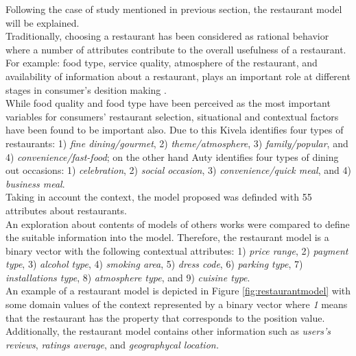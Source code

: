 Following the case of study mentioned in previous section,   the
restaurant model will be explained.\\  Traditionally, choosing a
restaurant has been considered as rational behavior where a number of
attributes contribute to the overall usefulness of a restaurant. For
example: food type, service quality, atmosphere of the restaurant, and
availability of information about a restaurant, plays an important
role at different stages in consumer's desition
making  \cite{auty1992consumer}. \\ 
While food quality and food type have
been perceived as the most important variables for consumers'
restaurant selection, situational and contextual factors have been
found to be important also. Due to this
Kivela  \cite{jack1997restaurant} identifies four types of restaurants:
1) \textit{fine dining/gourmet}, 2) \textit{theme/atmosphere}, 3)
\textit{family/popular}, and 4) \textit{convenience/fast-food}; on the
other hand Auty  \cite{auty1992consumer} identifies four types of dining
out occasions: 1) \textit{celebration}, 2) \textit{social occasion},
3) \textit{convenience/quick meal}, and 4) \textit{business meal}.\\
Taking in account the context, the model proposed was definded with 55
attributes about restaurants. \\ An exploration about contents of models
of others works were compared to define the suitable information into
the model. Therefore, the restaurant model is a binary vector with the
following contextual attributes: 1) \textit{price range}, 2)
\textit{payment type}, 3) \textit{alcohol type}, 
4) \textit{smoking area}, 5) \textit{dress code}, 6) \textit{parking type}, 7)
\textit{installations type}, 8) \textit{atmosphere type}, and 9)
\textit{cuisine type}. \\ An example of a restaurant model is depicted in
Figure  \ref{fig:restaurantmodel} with some domain values of the
context represented by a binary vector where \textit{1} means that the
restaurant has the property that corresponds to the position value.
Additionally, the restaurant model contains other information such as
\textit{users's reviews}, \textit{ratings average}, and
\textit{geographycal location.}

